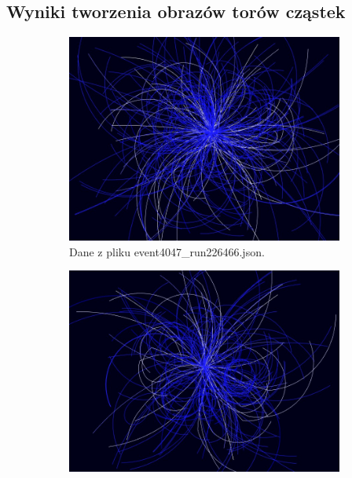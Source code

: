 \begin{appendices}
\renewcommand{\sectionname}{Załącznik}
\section{Wyniki tworzenia obrazów torów cząstek}
\label{Tory}
\begin{figure}[H]
	\begin{subfigure}{0.50\textwidth}
		\centering
 		\includegraphics[width=\textwidth]{TrackScreen7.jpg}
    	\caption{Dane z pliku event4047\_run226466.json.}
 		\label{rys18}
	\end{subfigure}
	\hfill
	\begin{subfigure}{0.50\textwidth}
		\centering
		\includegraphics[width=\textwidth]{TrackScreen3.jpg}

\end{subfigure}
\end{figure}
\end{appendices}
